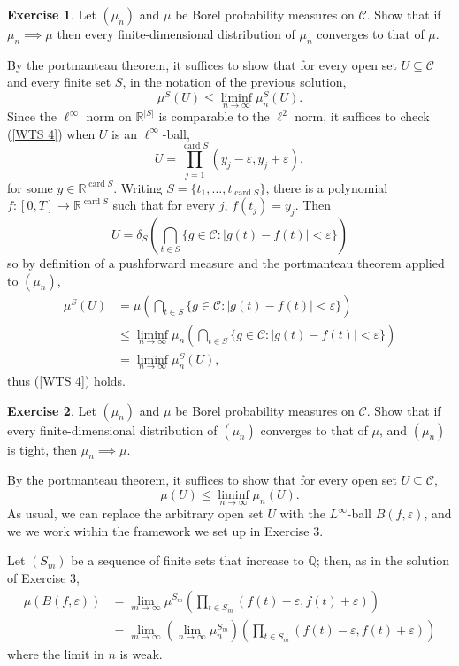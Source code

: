 \documentclass[10pt]{article}
\newcommand{\QQ}{\mathbb{Q}}
\newcommand{\RR}{\mathbb{R}}
\newcommand{\card}{\operatorname{card}}
\theoremstyle{definition}
\newtheorem{exer}{Exercise}
\begin{document}
\begin{exer}
Let $(\mu_n)$ and $\mu$ be Borel probability measures on $\mathcal C$. Show that if $\mu_n \implies \mu$ then every finite-dimensional distribution of $\mu_n$ converges to that of $\mu$.
\end{exer}

By the portmanteau theorem, it suffices to show that for every open set $U \subseteq \mathcal C$ and every finite set $S$, in the notation of the previous solution,
\begin{equation}
\label{WTS 4}
\mu^S(U) \leq \liminf_{n \to \infty} \mu_n^S(U).
\end{equation}
Since the $\ell^\infty$ norm on $\RR^{|S|}$ is comparable to the $\ell^2$ norm, it suffices to check (\ref{WTS 4}) when $U$ is an $\ell^\infty$-ball,
$$U = \prod_{j=1}^{\card S} (y_j - \varepsilon, y_j + \varepsilon),$$
for some $y \in \RR^{\card S}$. Writing $S = \{t_1, \dots, t_{\card S}\}$, there is a polynomial $f: [0, T] \to \RR^{\card S}$ such that for every $j$, $f(t_j) = y_j$. Then
$$U = \delta_S\left(\bigcap_{t \in S} \{g \in \mathcal C: |g(t) - f(t)| < \varepsilon\}\right)$$
so by definition of a pushforward measure and the portmanteau theorem applied to $(\mu_n)$,
\begin{align*}\mu^S(U) &= \mu\left(\bigcap_{t \in S} \{g \in \mathcal C: |g(t) - f(t)| < \varepsilon\}\right)\\
&\leq \liminf_{n \to \infty} \mu_n\left(\bigcap_{t \in S} \{g \in \mathcal C: |g(t) - f(t)| < \varepsilon\}\right)\\
&= \liminf_{n \to \infty} \mu^S_n(U),
\end{align*}
thus (\ref{WTS 4}) holds.

\begin{exer}
Let $(\mu_n)$ and $\mu$ be Borel probability measures on $\mathcal C$. Show that if every finite-dimensional distribution of $(\mu_n)$ converges to that of $\mu$, and $(\mu_n)$ is tight, then $\mu_n \implies \mu$.
\end{exer}

By the portmanteau theorem, it suffices to show that for every open set $U \subseteq \mathcal C$,
$$\mu(U) \leq \liminf_{n \to \infty} \mu_n(U).$$
As usual, we can replace the arbitrary open set $U$ with the $L^\infty$-ball $B(f, \varepsilon)$, and we we work within the framework we set up in Exercise 3.

Let $(S_m)$ be a sequence of finite sets that increase to $\QQ$; then, as in the solution of Exercise 3,
\begin{align*}
\mu(B(f, \varepsilon)) &= \lim_{m \to \infty} \mu^{S_m} \left(\prod_{t \in S_m} (f(t) - \varepsilon, f(t) + \varepsilon)\right)\\
&= \lim_{m \to \infty} \left(\lim_{n \to \infty} \mu^{S_m}_n \right) \left(\prod_{t \in S_m} (f(t) - \varepsilon, f(t) + \varepsilon)\right)
\end{align*}
where the limit in $n$ is weak.
\end{document}
